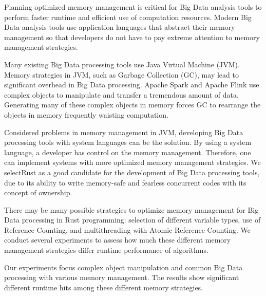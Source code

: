 


Planning optimized memory management is critical for Big Data analysis tools to perform faster runtime and efficient use of computation resources.
Modern Big Data analysis tools use application languages that abstract their memory management so that developers do not have to pay extreme attention to memory management strategies.

Many existing Big Data processing tools use Java Virtual Machine (JVM). 
Memory strategies in JVM, such as Garbage Collection (GC), may lead to significant overhead in Big Data processing. 
Apache Spark and Apache Flink use complex objects to manipulate and transfer a tremendous amount of data. 
Generating many of these complex objects in memory forces GC to rearrange the objects in memory frequently waisting computation. 

Considered problems in memory management in JVM, developing Big Data processing tools with system languages can be the solution.
By using a system language, a developer has control on the memory management. Therefore, one can implement systems with more optimized memory management strategies.
We selectRust as a good candidate for the development of Big Data processing tools, due to its ability to write memory-safe and fearless concurrent codes with its concept of ownership.

There may be many possible strategies to optimize memory management for Big Data processing in Rust programming: 
selection of different variable types, use of Reference Counting, and multithreading with Atomic Reference Counting.
We conduct several experiments to assess how much these different memory management strategies differ runtime performance of algorithms.

Our experiments focus complex object manipulation and common Big Data processing with various memory management.
The results show significant different runtime hits among these different memory strategies.
